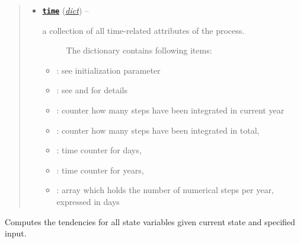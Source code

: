 \documentclass[letterpaper,10pt,english]{sphinxmanual}
\begin{document}
\begin{fulllineitems}
\begin{quote}
\begin{description}
\begin{itemize}
\item {} 
\href{http://docs.python.org/2.7/library/time.html\#module-time}{\textbf{\texttt{time}}} (\href{http://docs.python.org/2.7/library/stdtypes.html\#dict}{\emph{dict}}) -- \begin{description}
\item[{a collection of all time-related attributes of the process. }] \leavevmode
The dictionary contains following items:

\end{description}
\begin{itemize}
\item {} 
: see initialization parameter

\item {} 
: see {\hyperref[api/climlab.process:climlab.process.time_dependent_process.TimeDependentProcess.set_timestep]{\emph{}}} and {\hyperref[api/climlab.process:climlab.process.time_dependent_process.TimeDependentProcess.timestep]{\emph{}}} for details

\item {} 
: counter how many steps have been integrated in current year

\item {} 
: counter how many steps have been integrated in total,

\item {} 
: time counter for days,

\item {} 
: time counter for years,

\item {} 
: array which holds the number of numerical steps per year, expressed in days

\end{itemize}


\end{itemize}

\end{description}\end{quote}

\begin{fulllineitems}
\label{api/climlab.process:climlab.process.time_dependent_process.TimeDependentProcess.compute}
Computes the tendencies for all state variables given current state 
and specified input.


\end{fulllineitems}
\end{fulllineitems}
\end{document}
